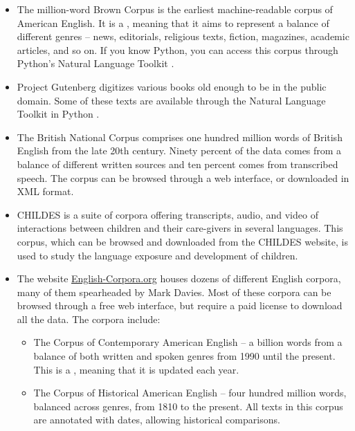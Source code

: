 \begin{itemize}
\item The million-word Brown Corpus \citep{FrancisKucera:1979} is the earliest machine-readable corpus of American English.  It is a
, meaning that it aims to represent a balance
of different genres -- news, editorials, religious texts, fiction,
magazines, academic articles, and so on.  If you know Python,  you can access this corpus through Python's Natural Language Toolkit \citep{LoperBird:2002}.

\item Project Gutenberg digitizes various books old enough to be
in the public domain.  Some of these texts are available through the
Natural Language Toolkit in Python \citep{LoperBird:2002}.


\item The British National Corpus \citep{BunardAston:1998} comprises one
hundred million words of British English from the late 20th
century.  Ninety percent of the data comes from a balance of different
written sources and ten percent comes from transcribed speech.  The
corpus can be browsed through a web interface, or downloaded in XML
format.

\item CHILDES \citep{MacWhinney:2000} is a suite of corpora offering
transcripts, audio, and video of interactions between children and
their care-givers in several languages.  This corpus, which can be
browsed and downloaded from the CHILDES website, is used to study the
language exposure and development of children.

\item The website \url{English-Corpora.org} houses dozens of different
English corpora, many of them spearheaded by  Mark
Davies.  Most of these corpora can be browsed through a free web
interface, but require a paid license to download all the data.  The
corpora include:

\begin{itemize}
\item The Corpus of Contemporary American English \citep{Davies:2009} -- a billion words from a
balance of both written and spoken genres from 1990 until the present.
This is a , meaning that it is updated each
year.

\item The Corpus of Historical American English \citep{Davies:2012} --
four hundred million words, balanced across genres, from 1810 to the
present.  All texts in this corpus are annotated with dates, allowing
historical comparisons.


\end{itemize}
\end{itemize}
